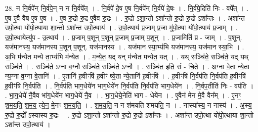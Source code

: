 \documentclass[17pt]{extarticle}
\begin{document}
28. न नि॒र्वपे᳚न् नि॒र्वपे॒न् न न नि॒र्वपे᳚त् । . नि॒र्वपे॑ दे॒ष ए॒ष नि॒र्वपे᳚न् नि॒र्वपे॑ दे॒षः । . नि॒र्वपे॒दिति॑ निः - वपे᳚त् । . ए॒ष ए॒वै वैष ए॒ष ए॒व । . ए॒व रु॒द्रो रु॒द्र ए॒वैव रु॒द्रः । . रु॒द्रो ऽशा॒न्तो ऽशा᳚न्तो रु॒द्रो रु॒द्रो ऽशा᳚न्तः । . अशा᳚न्त उपो॒त्था यो॑पो॒त्थाया शा॒न्तो ऽशा᳚न्त उपो॒त्थाय॑ । . उ॒पो॒त्थाय॑ प्र॒जाम् प्र॒जा मु॑पो॒त्था यो॑पो॒त्थाय॑ प्र॒जाम् । . उ॒पो॒त्थायेत्यु॑प - उ॒त्थाय॑ । . प्र॒जाम् प॒शून् प॒शून् प्र॒जाम् प्र॒जाम् प॒शून् । . प्र॒जामिति॑ प्र - जाम् । . प॒शून्. यज॑मानस्य॒ यज॑मानस्य प॒शून् प॒शून्. यज॑मानस्य । . यज॑मान स्या॒भ्य॑भि यज॑मानस्य॒ यज॑मान स्या॒भि । . अ॒भि म॑न्येत मन्ये ता॒भ्य॑भि म॑न्येत । . म॒न्ये॒त॒ यद् यन् म॑न्येत मन्येत॒ यत् । . यथ् सञ्चि॑ते॒ सञ्चि॑ते॒ यद् यथ् सञ्चि॑ते । . सञ्चि॑ते॒ ऽग्ना व॒ग्नौ सञ्चि॑ते॒ सञ्चि॑ते॒ ऽग्नौ । . सञ्चि॑त॒ इति॒ सं - चि॒ते॒ । . अ॒ग्ना वे॒ता न्ये॒ता न्य॒ग्ना व॒ग्ना वे॒तानि॑ । . ए॒तानि॑ ह॒वीꣳषि॑ ह॒वीꣳ ष्ये॒ता न्ये॒तानि॑ ह॒वीꣳषि॑ । . ह॒वीꣳषि॑ नि॒र्वप॑ति नि॒र्वप॑ति ह॒वीꣳषि॑ ह॒वीꣳषि॑ नि॒र्वप॑ति । . नि॒र्वप॑ति भाग॒धेये॑न भाग॒धेये॑न नि॒र्वप॑ति नि॒र्वप॑ति भाग॒धेये॑न । . नि॒र्वप॒तीति॑ निः - वप॑ति । . भा॒ग॒धेये॑ नै॒वैव भा॑ग॒धेये॑न भाग॒धेये॑ नै॒व । . भा॒ग॒धेये॒नेति॑ भाग - धेये॑न । . ए॒वैन॑ मेन मे॒वै वैन᳚म् । . ए॒नꣳ॒॒ श॒म॒य॒ति॒ श॒म॒य॒ त्ये॒न॒ मे॒नꣳ॒॒ श॒म॒य॒ति॒ । . श॒म॒य॒ति॒ न न श॑मयति शमयति॒ न । . नास्या᳚स्य॒ न नास्य॑ । . अ॒स्य॒ रु॒द्रो रु॒द्रो᳚ ऽस्यास्य रु॒द्रः । . रु॒द्रो ऽशा॒न्तो ऽशा᳚न्तो रु॒द्रो रु॒द्रो ऽशा᳚न्तः । . अशा᳚न्त उपो॒त्था यो॑पो॒त्थाया शा॒न्तो ऽशा᳚न्त उपो॒त्थाय॑ । \newline
\end{document}
